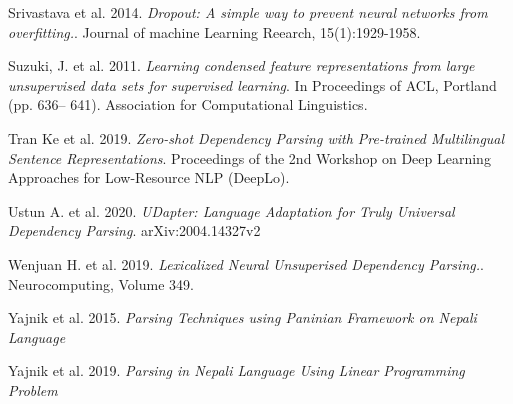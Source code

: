 \begin{thebibliography}{}
Srivastava et al. 2014. \textit{Dropout: A simple way to prevent neural networks from overfitting.}. Journal of machine Learning Reearch, 15(1):1929-1958.

Suzuki, J. et al. 2011. \textit{Learning condensed feature representations from
large unsupervised data sets for supervised learning}. In Proceedings of ACL, Portland (pp. 636–
641). Association for Computational Linguistics.

Tran Ke et al. 2019. \textit{Zero-shot Dependency Parsing with Pre-trained
Multilingual Sentence Representations}. Proceedings of the 2nd Workshop on Deep
Learning Approaches for Low-Resource NLP (DeepLo).

Ustun A. et al. 2020. \textit{UDapter: Language Adaptation for Truly Universal Dependency Parsing}. arXiv:2004.14327v2

Wenjuan H. et al. 2019. \textit{Lexicalized Neural Unsuperised Dependency Parsing.}. Neurocomputing, Volume 349.

Yajnik et al. 2015. \textit{Parsing Techniques using Paninian Framework on Nepali Language}

Yajnik et al. 2019. \textit{Parsing in Nepali Language Using Linear Programming Problem}

\end{thebibliography}

